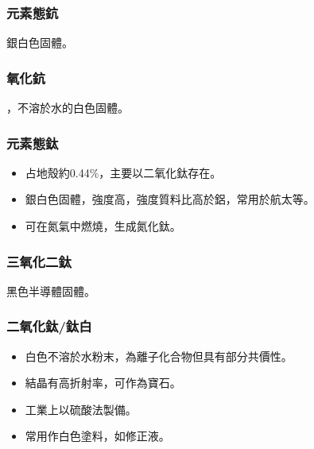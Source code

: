 \documentclass[a4paper,12pt]{report}
\begin{document}
\begin{itemize}
\subsubsection{元素態鈧}
銀白色固體。
\subsubsection{氧化鈧}
，不溶於水的白色固體。
\subsubsection{元素態鈦}
\begin{itemize}
\item 占地殼約0.44\%，主要以二氧化鈦存在。
\item 銀白色固體，強度高，強度質料比高於鋁，常用於航太等。
\item 可在氮氣中燃燒，生成氮化鈦。
\end{itemize}
\subsubsection{三氧化二鈦}
黑色半導體固體。
\subsubsection{二氧化鈦/鈦白}
\begin{itemize}
\item 白色不溶於水粉末，為離子化合物但具有部分共價性。
\item 結晶有高折射率，可作為寶石。
\item 工業上以硫酸法製備。
\item 常用作白色塗料，如修正液。
\end{itemize}

\end{itemize}
\end{document}
